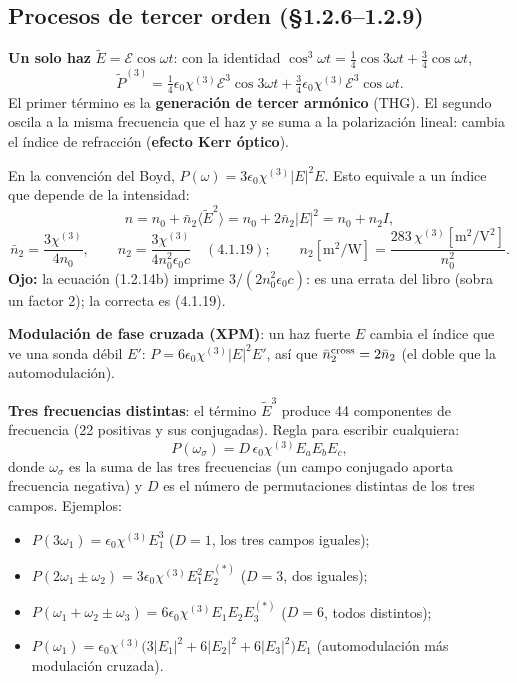\documentclass[10pt]{article}
\newcommand{\ojo}[1]{{\color{alerta}\textbf{Ojo:} #1}}
\begin{document}
\subsection{Procesos de tercer orden (§1.2.6–1.2.9)}
\textbf{Un solo haz} $\tilde E=\mathcal E\cos\omega t$: con la identidad $\cos^3\omega t=\frac14\cos3\omega t+\frac34\cos\omega t$,
\[
\tilde P^{(3)}=\tfrac14\epsilon_0\chi^{(3)}\mathcal E^3\cos3\omega t+\tfrac34\epsilon_0\chi^{(3)}\mathcal E^3\cos\omega t .
\]
El primer término es la \textbf{generación de tercer armónico} (THG). El segundo oscila a la misma frecuencia que el haz y se suma a la polarización lineal: cambia el índice de refracción (\textbf{efecto Kerr óptico}).

\begin{clave}[title={Índice no lineal}]
En la convención del Boyd, $P(\omega)=3\epsilon_0\chi^{(3)}|E|^2E$. Esto equivale a un índice que depende de la intensidad:
\[
n=n_0+\bar n_2\langle\tilde E^2\rangle=n_0+2\bar n_2|E|^2=n_0+n_2I,
\]
\[
\bar n_2=\frac{3\chi^{(3)}}{4n_0},\qquad \boxed{n_2=\frac{3\chi^{(3)}}{4n_0^2\epsilon_0c}}\quad(4.1.19);\qquad n_2[\mathrm{m^2/W}]=\frac{283\,\chi^{(3)}[\mathrm{m^2/V^2}]}{n_0^2}.
\]
\ojo{la ecuación (1.2.14b) imprime $3/(2n_0^2\epsilon_0c)$: es una errata del libro (sobra un factor 2); la correcta es (4.1.19).}

\textbf{Modulación de fase cruzada (XPM)}: un haz fuerte $E$ cambia el índice que ve una sonda débil $E'$: $P=6\epsilon_0\chi^{(3)}|E|^2E'$, así que $\bar n_2^{\rm cross}=2\bar n_2$ (el doble que la automodulación).
\end{clave}

\textbf{Tres frecuencias distintas}: el término $\tilde E^3$ produce 44 componentes de frecuencia (22 positivas y sus conjugadas). Regla para escribir cualquiera:
\[
P(\omega_\sigma)=D\,\epsilon_0\chi^{(3)}E_aE_bE_c ,
\]
donde $\omega_\sigma$ es la suma de las tres frecuencias (un campo conjugado aporta frecuencia negativa) y $D$ es el número de permutaciones distintas de los tres campos. Ejemplos:
\begin{itemize}
\item $P(3\omega_1)=\epsilon_0\chi^{(3)}E_1^3$ \quad ($D=1$, los tres campos iguales);
\item $P(2\omega_1\pm\omega_2)=3\epsilon_0\chi^{(3)}E_1^2E_2^{(*)}$ \quad ($D=3$, dos iguales);
\item $P(\omega_1+\omega_2\pm\omega_3)=6\epsilon_0\chi^{(3)}E_1E_2E_3^{(*)}$ \quad ($D=6$, todos distintos);
\item $P(\omega_1)=\epsilon_0\chi^{(3)}\big(3|E_1|^2+6|E_2|^2+6|E_3|^2\big)E_1$ \quad (automodulación más modulación cruzada).
\end{itemize}
\end{document}

